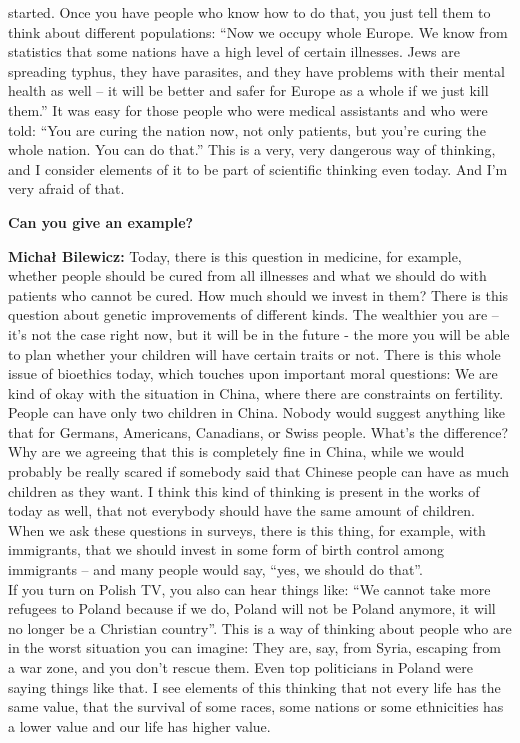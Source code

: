 started. Once you have people who know how to do that, you just tell them to think about different populations: ``Now we occupy whole Europe. We know from statistics that some nations have a high level of certain illnesses. Jews are spreading typhus, they have parasites, and they have problems with their mental health as well – it will be better and safer for Europe as a whole if we just kill them.'' It was easy for those people who were medical assistants and who were told: ``You are curing the nation now, not only patients, but you’re curing the whole nation. You can do that.'' This is a very, very dangerous way of thinking, and I consider elements of it to be part of scientific thinking even today. And I’m very afraid of that.

\textbf{Can you give an example?} 

\textbf{Michał Bilewicz:} Today, there is this question in medicine, for example, whether people should be cured from all illnesses and what we should do with patients who cannot be cured. How much should we invest in them? There is this question about genetic improvements of different kinds. The wealthier you are – it’s not the case right now, but it will be in the future -  the more you will be able to plan whether your children will have certain traits or not. There is this whole issue of bioethics today, which touches upon important moral questions: We are kind of okay with the situation in China, where there are constraints on fertility. People can have only two children in China. Nobody would suggest anything like that for Germans, Americans, Canadians, or Swiss people. What’s the difference? Why are we agreeing that this is completely fine in China, while we would probably be really scared if somebody said that Chinese people can have as much children as they want. I think this kind of thinking is present in the works of today as well, that not everybody should have the same amount of children. When we ask these questions in surveys, there is this thing, for example, with immigrants, that we should invest in some form of birth control among immigrants – and many people would say, ``yes, we should do that''.\\ If you turn on Polish TV, you also can hear things like: ``We cannot take more refugees to Poland because if we do, Poland will not be Poland anymore, it will no longer be a Christian country''. This is a way of thinking about people who are in the worst situation you can imagine: They are, say, from Syria, escaping from a war zone, and you don’t rescue them. Even top politicians in Poland were saying things like that. I see elements of this thinking that not every life has the same value, that the survival of some races, some nations or some ethnicities has a lower value and our life has higher value.

